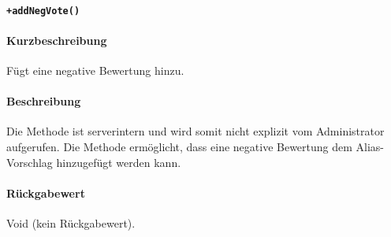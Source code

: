 \paragraph*{\texttt{+addNegVote()}}%
\paragraph*{Kurzbeschreibung}
Fügt eine negative Bewertung hinzu.
\paragraph*{Beschreibung}
Die Methode ist serverintern und wird somit nicht explizit vom Administrator aufgerufen.
Die Methode ermöglicht, dass eine negative Bewertung dem Alias-Vorschlag hinzugefügt werden kann.
\paragraph*{Rückgabewert}
Void (kein Rückgabewert).
